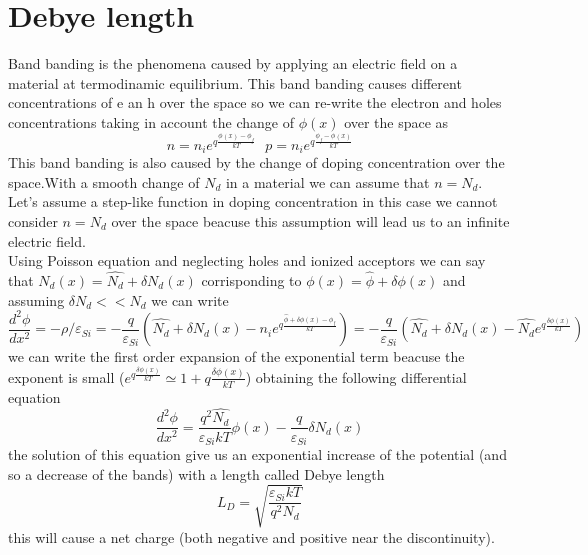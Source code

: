\section{Debye length}

Band banding is the phenomena caused by applying an electric field on a material at termodinamic equilibrium. This band banding causes different concentrations of e an h over the space so we can re-write the electron and holes concentrations taking in account the change of $\phi(x)$ over the space as
\begin{equation}
n=n_ie^{q\frac{\phi(x)-\phi_f}{kT}} \ \ \ p=n_ie^{q\frac{\phi_f-\phi(x)}{kT}}
\end{equation}
This band banding is also caused by the change of doping concentration over the space.With a smooth change of $N_d$ in a material we can assume that $n=N_d$.\\
Let's assume a step-like function in doping concentration in this case we cannot consider $n=N_d$ over the space beacuse this assumption will lead us to an infinite electric field.\\ 
Using Poisson equation and neglecting holes and ionized acceptors we can say that $N_d(x)=\hat{N_d}+\delta N_d(x)$ corrisponding to $\phi(x)=\hat{\phi}+\delta \phi(x)$ and assuming $\delta N_d<<N_d $ we can write
\begin{equation}
\frac{d^2\phi}{dx^2}=-\rho/\varepsilon_{Si}=-\frac{q}{\varepsilon_{Si}}(\hat{N_d}+\delta N_d(x)-n_ie^{q\frac{\hat{\phi}+\delta\phi(x)-\phi_f}{kT}})=-\frac{q}{\varepsilon_{Si}}(\hat{N_d}+\delta N_d(x)-\hat{N_d}e^{q\frac{\delta\phi(x)}{kT}})
\end{equation}  
we can write the first order expansion of the exponential term beacuse the exponent is small ($e^{q\frac{\delta\phi(x)}{kT}}\simeq 1+q\frac{\delta\phi(x)}{kT} $) obtaining the following differential equation
\begin{equation}
\frac{d^2\phi}{dx^2}=\frac{q^2\hat{N_d}}{\varepsilon_{Si}kT}\phi(x)-\frac{q}{\varepsilon_{Si}}\delta N_d(x)
\end{equation}
the solution of this equation give us an exponential increase of the potential (and so a decrease of the bands) with a length called Debye length
\begin{equation}
L_D=\sqrt{\frac{\varepsilon_{Si}kT}{q^2N_d}}
\end{equation}
this will cause a net charge (both negative and positive near the discontinuity).\\


